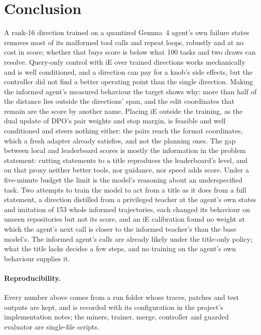 \documentclass[11pt]{article}
\begin{document}
\section{Conclusion}

A rank-16 direction trained on a quantized Gemma~4 agent's own failure states removes most of its malformed tool calls and repeat loops, robustly and at no cost in score; whether that buys score is below what 100 tasks and two draws can resolve. Query-only control with iE over trained directions works mechanically and is well conditioned, and a direction can pay for a knob's side effects, but the controller did not find a better operating point than the single direction. Making the informed agent's measured behaviour the target shows why: more than half of the distance lies outside the directions' span, and the edit coordinates that remain are the score by another name. Placing iE outside the training, as the dual update of DPO's pair weights and stop margin, is feasible and well conditioned and steers nothing either: the pairs reach the format coordinates, which a fresh adapter already satisfies, and not the planning ones. The gap between local and leaderboard scores is mostly the information in the problem statement: cutting statements to a title reproduces the leaderboard's level, and on that proxy neither better tools, nor guidance, nor speed adds score. Under a five-minute budget the limit is the model's reasoning about an underspecified task. Two attempts to train the model to act from a title as it does from a full statement, a direction distilled from a privileged teacher at the agent's own states and imitation of 153 whole informed trajectories, each changed its behaviour on unseen repositories but not its score, and an iE calibration found no weight at which the agent's next call is closer to the informed teacher's than the base model's. The informed agent's calls are already likely under the title-only policy; what the title lacks decides a few steps, and no training on the agent's own behaviour supplies it.

\paragraph{Reproducibility.} Every number above comes from a run folder whose traces, patches and test outputs are kept, and is recorded with its configuration in the project's implementation notes; the miners, trainer, merge, controller and guarded evaluator are single-file scripts.
\end{document}
